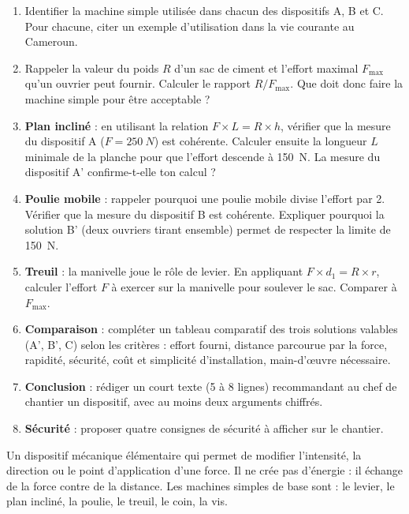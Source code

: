 \documentclass[11pt]{article}
\newcounter{popsec}
\newcounter{popsub}
\newcommand{\courssub}[1]{%
  \stepcounter{popsub}%
  \par\vspace{9pt}\noindent{\popxbold\fontsize{11.5}{13}\selectfont\color{popink}{\color{poporange}\thepopsec.\thepopsub}\hspace{6pt}#1}\par\nopagebreak\vspace{4pt}
}
\begin{document}
\begin{enumerate}
\item Identifier la machine simple utilisée dans chacun des dispositifs A, B et C. Pour chacune, citer un exemple d'utilisation dans la vie courante au Cameroun.
\item Rappeler la valeur du poids $R$ d'un sac de ciment et l'effort maximal $F_{\max}$ qu'un ouvrier peut fournir. Calculer le rapport $R/F_{\max}$. Que doit donc faire la machine simple pour être acceptable ?
\item \textbf{Plan incliné} : en utilisant la relation $F \times L = R \times h$, vérifier que la mesure du dispositif A ($F = \SI{250}{N}$) est cohérente. Calculer ensuite la longueur $L$ minimale de la planche pour que l'effort descende à \SI{150}{N}. La mesure du dispositif A' confirme-t-elle ton calcul ?
\item \textbf{Poulie mobile} : rappeler pourquoi une poulie mobile divise l'effort par 2. Vérifier que la mesure du dispositif B est cohérente. Expliquer pourquoi la solution B' (deux ouvriers tirant ensemble) permet de respecter la limite de \SI{150}{N}.
\item \textbf{Treuil} : la manivelle joue le rôle de levier. En appliquant $F \times d_1 = R \times r$, calculer l'effort $F$ à exercer sur la manivelle pour soulever le sac. Comparer à $F_{\max}$.
\item \textbf{Comparaison} : compléter un tableau comparatif des trois solutions valables (A', B', C) selon les critères : effort fourni, distance parcourue par la force, rapidité, sécurité, coût et simplicité d'installation, main-d'œuvre nécessaire.
\item \textbf{Conclusion} : rédiger un court texte (5 à 8 lignes) recommandant au chef de chantier un dispositif, avec au moins deux arguments chiffrés.
\item \textbf{Sécurité} : proposer quatre consignes de sécurité à afficher sur le chantier.
\end{enumerate}

\courssub{Ressources à mobiliser}

\begin{definition}
Un dispositif mécanique élémentaire qui permet de modifier l'intensité, la direction ou le point d'application d'une force. Il ne crée pas d'énergie : il échange de la force contre de la distance. Les machines simples de base sont : le levier, le plan incliné, la poulie, le treuil, le coin, la vis.
\end{definition}
\end{document}
